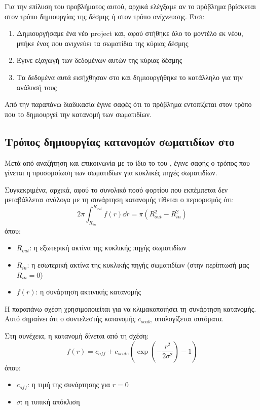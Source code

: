 Για την επίλυση του προβλήματος αυτού, αρχικά ελέγξαμε αν το πρόβλημα βρίσκεται στον τρόπο δημιουργίας της δέσμης ή στον τρόπο ανίχνευσης. 
Έτσι:
\begin{enumerate}
\item Δημιουργήσαμε ένα νέο project και, αφού στήθηκε όλο το μοντέλο εκ νέου, μπήκε ένας  που ανιχνεύει τα σωματίδια της κύριας δέσμης
\item Έγινε εξαγωγή των δεδομένων αυτών της κύριας δέσμης
\item Τα δεδομένα αυτά εισήχθησαν στο  και δημιουργήθηκε το κατάλληλο  για την ανάλυσή τους
\end{enumerate}

Από την παραπάνω διαδικασία έγινε σαφές ότι το πρόβλημα εντοπίζεται στον τρόπο που το  δημιουργεί την κατανομή των σωματιδίων.

\subsection{Τρόπος δημιουργίας  κατανομών σωματιδίων στο }

Μετά από αναζήτηση και επικοινωνία με το ίδιο το  του , έγινε σαφής ο τρόπος που γίνεται η προσομοίωση των σωματιδίων για  κυκλικές πηγές σωματιδίων.

Συγκεκριμένα, αρχικά, αφού το συνολικό ποσό φορτίου που εκπέμπεται δεν μεταβάλλεται ανάλογα με τη συνάρτηση κατανομής τίθεται ο περιορισμός ότι:
\[ 2\pi \int_{R_{in}}^{R_{out}} f(r) \dd r = \pi \left(R_{out}^2 - R_{in}^2 \right) \]
όπου:
\begin{itemize}
\item $R_{out}$: η εξωτερική ακτίνα της κυκλικής πηγής σωματιδίων
\item $R_{in}$: η εσωτερική ακτίνα της κυκλικής πηγής σωματιδίων (στην περίπτωσή μας $R_{in} = 0$)
\item $f(r)$: η συνάρτηση ακτινικής κατανομής 
\end{itemize} 

Η παραπάνω σχέση χρησιμοποιείται για να κλιμακοποιήσει τη συνάρτηση κατανομής. 
Αυτό σημαίνει ότι ο συντελεστής κατανομής $c_{scale}$ υπολογίζεται αυτόματα.

Στη συνέχεια, η  κατανομή δίνεται από τη σχέση:
\[f(r) = c_{off} + c_{scale} \left( \exp \left(-\frac{r^2}{2\sigma^2}\right) - 1 \right)\]
όπου:
\begin{itemize}
\item $c_{off}$: η τιμή της συνάρτησης για $r = 0$
\item $\sigma$: η τυπική απόκλιση
\end{itemize} 

